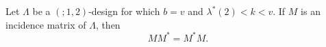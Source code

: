 Let $\Lambda$ be a $(; 1, 2)$-design for which $b = v$ and $\lambda^*(2) < k < v$. If $M$ is an incidence matrix of $\Lambda$, then
$$MM^* = M^*M.$$
